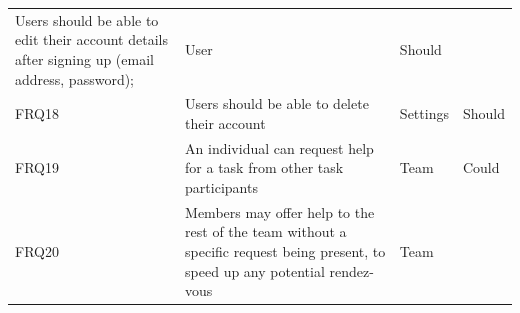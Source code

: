 \documentclass[12pt]{report}
\begin{document}
\begin{longtable}[]{@{}llll@{}}
\begin{minipage}[t]{0.64\columnwidth}
Users should be able to edit their account details after signing up
(email address, password);\strut
\end{minipage} & \begin{minipage}[t]{0.12\columnwidth}\raggedright\strut
User\strut
\end{minipage} & \begin{minipage}[t]{0.09\columnwidth}\raggedright\strut
Should\strut
\end{minipage}\tabularnewline
\begin{minipage}[t]{0.04\columnwidth}\raggedright\strut
FRQ18\strut
\end{minipage} & \begin{minipage}[t]{0.64\columnwidth}\raggedright\strut
Users should be able to delete their account\strut
\end{minipage} & \begin{minipage}[t]{0.12\columnwidth}\raggedright\strut
Settings\strut
\end{minipage} & \begin{minipage}[t]{0.09\columnwidth}\raggedright\strut
Should\strut
\end{minipage}\tabularnewline
\begin{minipage}[t]{0.04\columnwidth}\raggedright\strut
FRQ19\strut
\end{minipage} & \begin{minipage}[t]{0.64\columnwidth}\raggedright\strut
An individual can request help for a task from other task
participants\strut
\end{minipage} & \begin{minipage}[t]{0.12\columnwidth}\raggedright\strut
Team\strut
\end{minipage} & \begin{minipage}[t]{0.09\columnwidth}\raggedright\strut
Could\strut
\end{minipage}\tabularnewline
\begin{minipage}[t]{0.04\columnwidth}\raggedright\strut
FRQ20\strut
\end{minipage} & \begin{minipage}[t]{0.64\columnwidth}\raggedright\strut
Members may offer help to the rest of the team without a specific
request being present, to speed up any potential rendez-vous\strut
\end{minipage} & \begin{minipage}[t]{0.12\columnwidth}\raggedright\strut
Team\strut
\end{minipage} & \begin{minipage}[t]{0.09\columnwidth}\raggedright\strut

\end{minipage}
\end{longtable}
\end{document}
